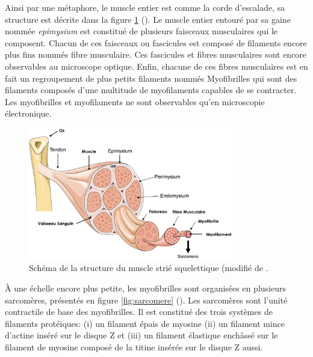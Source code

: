 Ainsi par une métaphore, le muscle entier est comme la corde d'escalade, sa structure est décrite dans la figure \ref{fig:muscle_struct} (\cite{burr_basic_2019}). Le muscle entier entouré par sa gaine nommée \textit{epimysium} est constitué de plusieurs faisceaux musculaires qui le composent. Chacun de ces faisceaux ou fascicules est composé de filaments encore plus fins nommés fibre musculaire. Ces fascicules et fibres musculaires sont encore observables au microscope optique. Enfin, chacune de ces fibres musculaires est en fait un regroupement de plus petits filaments nommés Myofibrilles qui  sont des filaments composés d'une multitude de myofilaments capables de se contracter. Les myofibrilles et myofilaments ne sont observables qu'en microscopie électronique.

\begin{figure}[!ht]
 \centering
 \includegraphics[width=0.8\textwidth]{figures/muscle.png}
 \caption[Schéma de la structure du muscle strié squelettique (modifié de \cite{burr_basic_2019}]{Schéma de la structure du muscle strié squelettique (modifié de \cite{burr_basic_2019}.}
 \label{fig:muscle_struct}
\end{figure}
À une échelle encore plus petite, les myofibrilles sont organisées en plusieurs sarcomères, présentés en figure \ref{fig:sarcomere} (\cite{burr_basic_2019}). Les sarcomères sont l'unité contractile de base des myofibrilles. Il est constitué des trois systèmes de filaments protéiques: (i) un filament épais de myosine (ii) un filament mince d'actine inséré sur le disque Z et (iii) un filament élastique enchâssé sur le filament de myosine composé de la titine insérée sur le disque Z aussi.

